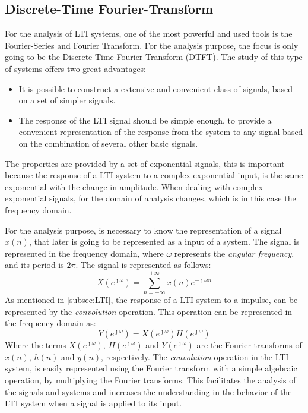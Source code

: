 \subsection{Discrete-Time Fourier-Transform}
For the analysis of LTI systems, one of the most powerful and used tools is the Fourier-Series and Fourier Transform. For the analysis purpose, the focus is only going to be the Discrete-Time Fourier-Transform (DTFT). The study of this type of systems offers two great advantages:
\begin{itemize}
    \item It is possible to construct a extensive and convenient class of signals, based on a set of simpler signals.
    \item The response of the LTI signal should be simple enough, to provide a convenient representation of the response from the system to any signal based on the combination of several other basic signals. 
\end{itemize} 
The properties are provided by a set of exponential signals, this is important because the response of a LTI system to a complex exponential input, is the same exponential with the change in amplitude. When dealing with complex exponential signals, for the domain of analysis changes, which is in this case the frequency domain.

For the analysis purpose, is necessary to know the representation of a signal $x(n)$, that later is going to be represented as a input of a system. The signal is represented in the frequency domain, where $\omega$ represents the \textit{angular frequency}, and its period is $2\pi$. The signal is represented as follows:
\begin{equation}
    X(e^{\jmath \omega})=\sum_{n=-\infty}^{+\infty}x(n)e^{-\jmath \omega n}
\end{equation}
As mentioned in \ref{subsec:LTI}, the response of a LTI system to a impulse, can be represented by the \textit{convolution} operation. This operation can be represented in the frequency domain as:
\begin{equation}
    Y(e^{\jmath\omega})= X(e^{\jmath\omega})H(e^{\jmath\omega})
\end{equation}
Where the terms $X(e^{\jmath\omega})$, $H(e^{\jmath\omega})$ and $Y(e^{\jmath\omega})$ are the Fourier transforms of $x(n)$, $h(n)$ and $y(n)$, respectively. The \textit{convolution} operation in the LTI system, is easily represented using the Fourier transform with a simple algebraic operation, by multiplying the Fourier transforms. This facilitates the analysis of the signals and systems and increases the understanding in the behavior of the LTI system when a signal is applied to its input.

